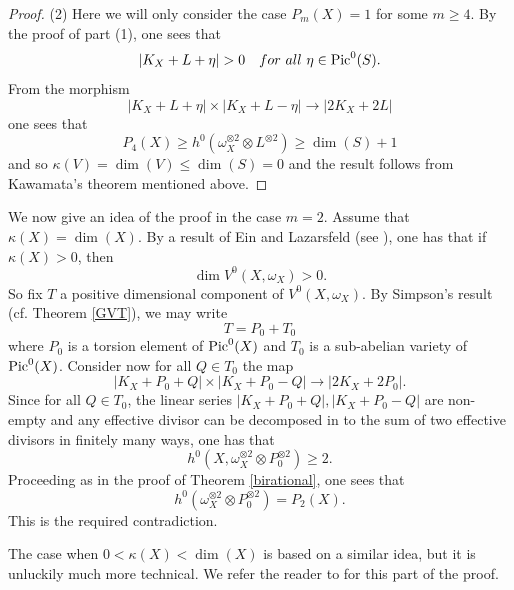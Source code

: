 \documentclass[10pt]{amsart}
\newcommand\Pic{{\text{\rm Pic}}}
\newcommand\lra{\longrightarrow}
\newcommand\ot{{\otimes}}
\begin{document}
\begin{proof}
(2) Here we will only consider the case $P_m(X)=1$ for some $m\geq 4$.
By the proof of
part (1), one sees that $$|K_X+L+\eta|>0\ \ \  for\ all\  \eta \in 
\Pic ^0(S).$$
From the morphism $$|K_X+L+\eta|\times |K_X+L-\eta|\lra
|2K_X+2L|$$
one sees that
$$P_4(X)\geq h^0(\omega _X ^{\ot 2}\ot L^{\ot 2})\geq \dim (S)+1$$
and so $\kappa (V)=\dim (V)\leq \dim (S)=0$ and the result follows 
from Kawamata's 
theorem mentioned above.
\end{proof}


We now give an idea of the proof in the case $m=2$.
Assume that $\kappa (X)=\dim (X)$. By a result of Ein and Lazarsfeld 
(see \cite{CH1}),
one has that if $\kappa (X)>0$, then
$$\dim V^0(X,\omega _X)>0.$$
So fix $T$ a positive dimensional component of $V^0(X,\omega _X)$.
By Simpson's result (cf. Theorem \ref{GVT}), we may write
$$T=P_0+T_0$$ where $P_0$ is a torsion element
of $\Pic ^0(X)$ and $T_0$ is a sub-abelian variety of $\Pic ^0(X)$.
Consider now for all $Q\in T_0$ the map
$$|K_X+P_0+Q|\times |K_X +P_0-Q|\lra |2K_X+2P_0|.$$
Since for all $Q\in T_0$, the linear series $|K_X+P_0+Q|,|K_X +P_0-Q|$
are non-empty and any effective divisor can be decomposed in to the 
sum of two effective divisors in finitely many ways, one has that 
$$h^0(X,\omega _X ^{\ot 2}\ot P_0^{\ot 2})\geq 2.$$
Proceeding as in the proof of Theorem \ref{birational},
one sees that $$h^0(\omega _X ^{\ot 2}\ot P_0^{\ot 2})= P_2(X).$$
This is the required contradiction.

The case when $0<\kappa (X) <\dim (X)$ is based on a similar idea,
but it is unluckily much more technical.
We refer the reader to \cite{CH1}
for this part of the proof.
\end{document}
